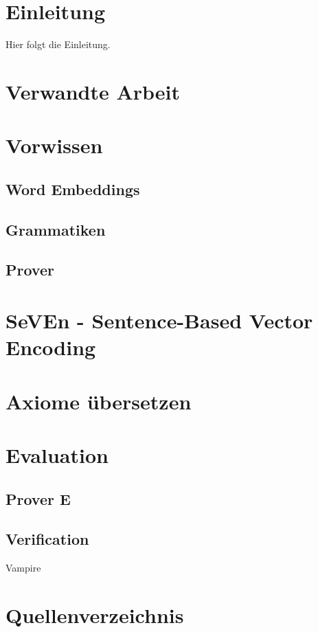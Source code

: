 \documentclass[german,version-2020-11]{uzl-thesis}
\begin{document}
%
%


\chapter{Einleitung}
Hier folgt die Einleitung.
\chapter{Verwandte Arbeit}
%
\chapter{Vorwissen}
\section{Word Embeddings}
\section{Grammatiken}
\section{Prover}
%
\chapter{SeVEn - Sentence-Based Vector Encoding}
\chapter{Axiome übersetzen}
\chapter{Evaluation}
\section{Prover E}
\section{Verification}
Vampire
\chapter{Quellenverzeichnis}
\end{document}
